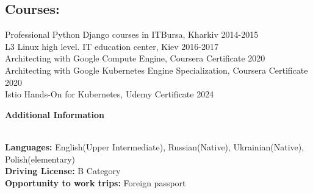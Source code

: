 \documentclass[letterpaper]{article}
\renewcommand{\section}[1]{
  {
    \large \colorbox{my-gray}{
      \begin{minipage}
        {\textwidth-0.175in}
        {\textbf{#1 \vphantom{p\^{E}}}}
      \end{minipage}
    }
  }
}
\begin{document}
\subsection{Courses:}
\label{sec-4-1-2}
Professional Python Django courses in ITBursa, Kharkiv 2014-2015\\
L3 Linux high level. IT education center, Kiev 2016-2017\\
Architecting with Google Compute Engine, Coursera Certificate 2020\\
Architecting with Google Kubernetes Engine Specialization, Coursera Certificate 2020\\
Istio Hands-On for Kubernetes, Udemy Certificate 2024
\vspace*{1em plus .6em minus .5em}
\section{Additional Information}
\vspace*{1em}\\
\textbf{Languages:}  English(Upper Intermediate), Russian(Native), Ukrainian(Native), Polish(elementary)\\
\textbf{Driving License:} B Category\\
\textbf{Opportunity to work trips:} Foreign passport\\
\end{document}
